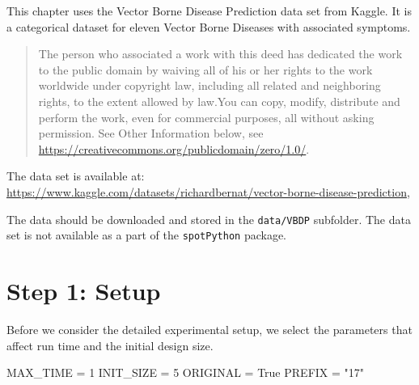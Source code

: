 \documentclass[
  letterpaper,
  DIV=11,
  numbers=noendperiod]{scrreprt}
\newenvironment{Shaded}{\begin{snugshade}}{\end{snugshade}}
\newcommand{\DecValTok}[1]{\textcolor[rgb]{0.68,0.00,0.00}{#1}}
\newcommand{\NormalTok}[1]{\textcolor[rgb]{0.00,0.23,0.31}{#1}}
\newcommand{\OperatorTok}[1]{\textcolor[rgb]{0.37,0.37,0.37}{#1}}
\newcommand{\StringTok}[1]{\textcolor[rgb]{0.13,0.47,0.30}{#1}}
\newcommand{\VariableTok}[1]{\textcolor[rgb]{0.07,0.07,0.07}{#1}}
\begin{document}
\begin{tcolorbox}[enhanced jigsaw, left=2mm, title=\textcolor{quarto-callout-important-color}{\faExclamation}\hspace{0.5em}{Vector Borne Disease Prediction Data Set}, titlerule=0mm, toprule=.15mm, leftrule=.75mm, colbacktitle=quarto-callout-important-color!10!white, colback=white, arc=.35mm, toptitle=1mm, bottomtitle=1mm, colframe=quarto-callout-important-color-frame, bottomrule=.15mm, rightrule=.15mm, breakable, coltitle=black, opacitybacktitle=0.6, opacityback=0]

This chapter uses the Vector Borne Disease Prediction data set from
Kaggle. It is a categorical dataset for eleven Vector Borne Diseases
with associated symptoms.

\begin{quote}
The person who associated a work with this deed has dedicated the work
to the public domain by waiving all of his or her rights to the work
worldwide under copyright law, including all related and neighboring
rights, to the extent allowed by law.You can copy, modify, distribute
and perform the work, even for commercial purposes, all without asking
permission. See Other Information below, see
\url{https://creativecommons.org/publicdomain/zero/1.0/}.
\end{quote}

The data set is available at:
\url{https://www.kaggle.com/datasets/richardbernat/vector-borne-disease-prediction},

The data should be downloaded and stored in the \texttt{data/VBDP}
subfolder. The data set is not available as a part of the
\texttt{spotPython} package.

\end{tcolorbox}

\hypertarget{sec-setup-17}{%
\section{Step 1: Setup}\label{sec-setup-17}}

Before we consider the detailed experimental setup, we select the
parameters that affect run time and the initial design size.

\begin{Shaded}
\begin{Highlighting}[]
\NormalTok{MAX\_TIME }\OperatorTok{=} \DecValTok{1}
\NormalTok{INIT\_SIZE }\OperatorTok{=} \DecValTok{5}
\NormalTok{ORIGINAL }\OperatorTok{=} \VariableTok{True}
\NormalTok{PREFIX }\OperatorTok{=} \StringTok{"17"}
\end{Highlighting}
\end{Shaded}
\end{document}
